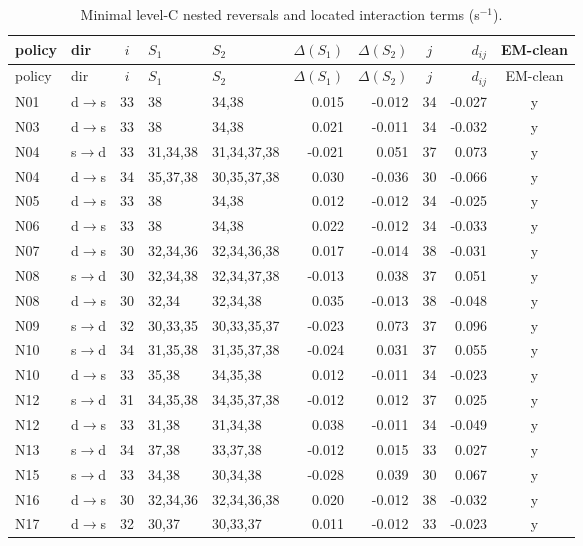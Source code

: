 \documentclass[10pt,a4paper]{article}
\begin{document}
{\tiny
\begin{longtable}{llcllrrcrc}
\caption{Minimal level-C nested reversals and located interaction terms (s$^{-1}$).}\label{tab:s-wit}\\
\toprule
policy & dir & $i$ & $S_1$ & $S_2$ & $\Delta(S_1)$ & $\Delta(S_2)$ & $j$ & $d_{ij}$ & EM-clean \\
\midrule
\endfirsthead
\toprule
policy & dir & $i$ & $S_1$ & $S_2$ & $\Delta(S_1)$ & $\Delta(S_2)$ & $j$ & $d_{ij}$ & EM-clean \\
\midrule
\endhead
N01 & d$\to$s & 33 & 38 & 34,38 & 0.015 & -0.012 & 34 & -0.027 & y \\
N03 & d$\to$s & 33 & 38 & 34,38 & 0.021 & -0.011 & 34 & -0.032 & y \\
N04 & s$\to$d & 33 & 31,34,38 & 31,34,37,38 & -0.021 & 0.051 & 37 & 0.073 & y \\
N04 & d$\to$s & 34 & 35,37,38 & 30,35,37,38 & 0.030 & -0.036 & 30 & -0.066 & y \\
N05 & d$\to$s & 33 & 38 & 34,38 & 0.012 & -0.012 & 34 & -0.025 & y \\
N06 & d$\to$s & 33 & 38 & 34,38 & 0.022 & -0.012 & 34 & -0.033 & y \\
N07 & d$\to$s & 30 & 32,34,36 & 32,34,36,38 & 0.017 & -0.014 & 38 & -0.031 & y \\
N08 & s$\to$d & 30 & 32,34,38 & 32,34,37,38 & -0.013 & 0.038 & 37 & 0.051 & y \\
N08 & d$\to$s & 30 & 32,34 & 32,34,38 & 0.035 & -0.013 & 38 & -0.048 & y \\
N09 & s$\to$d & 32 & 30,33,35 & 30,33,35,37 & -0.023 & 0.073 & 37 & 0.096 & y \\
N10 & s$\to$d & 34 & 31,35,38 & 31,35,37,38 & -0.024 & 0.031 & 37 & 0.055 & y \\
N10 & d$\to$s & 33 & 35,38 & 34,35,38 & 0.012 & -0.011 & 34 & -0.023 & y \\
N12 & s$\to$d & 31 & 34,35,38 & 34,35,37,38 & -0.012 & 0.012 & 37 & 0.025 & y \\
N12 & d$\to$s & 33 & 31,38 & 31,34,38 & 0.038 & -0.011 & 34 & -0.049 & y \\
N13 & s$\to$d & 34 & 37,38 & 33,37,38 & -0.012 & 0.015 & 33 & 0.027 & y \\
N15 & s$\to$d & 33 & 34,38 & 30,34,38 & -0.028 & 0.039 & 30 & 0.067 & y \\
N16 & d$\to$s & 30 & 32,34,36 & 32,34,36,38 & 0.020 & -0.012 & 38 & -0.032 & y \\
N17 & d$\to$s & 32 & 30,37 & 30,33,37 & 0.011 & -0.012 & 33 & -0.023 & y \\

\end{longtable}}
\end{document}
